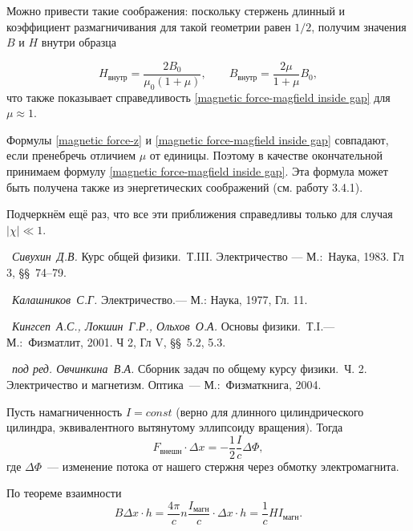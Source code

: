 Можно привести такие соображения: поскольку стержень длинный и коэффициент размагничивания для такой геометрии равен $1/2$,  получим значения $B$ и $H$ внутри образца

\begin{equation*}
	H_{\text{внутр}} = \frac{2B_0}{\mu_0 (1 + \mu)},\qquad	B_{\text{внутр}} = \frac{2\mu}{1 + \mu} B_0,
\end{equation*}
что также показывает справедливость \eqref{magnetic force-magfield inside gap} для $\mu \approx 1$.

Формулы \eqref{magnetic force-z} и \eqref{magnetic force-magfield inside gap} совпадают, если пренебречь отличием $\mu$ от единицы. Поэтому в качестве окончательной принимаем формулу \eqref{magnetic force-magfield inside gap}. Эта формула может быть получена также из энергетических соображений (см. работу 3.4.1).

Подчеркнём ещё раз, что все эти приближения справедливы только для случая $|\chi| \ll 1$.

\begin{lab:literature}
	\item~\emph{Сивухин~Д.В.} Курс общей физики.~Т.III. Электричество --- М.:~Наука, 1983. Гл 3, \S\S~74--79.
	\item~\emph{Калашников~С.Г.} Электричество.--- М.: Наука, 1977, Гл. 11.
	\item~\emph{Кингсеп~А.С., Локшин~Г.Р., Ольхов~О.А.} Основы физики.~Т.I.--- М.:~Физматлит, 2001. Ч 2, Гл V, \S\S~5.2, 5.3.
	\item~\emph{под ред. Овчинкина~В.А.} Сборник задач по общему курсу физики.~Ч. 2. Электричество и магнетизм. Оптика~--- М.:~Физматкнига, 2004.
\end{lab:literature}


Пусть намагниченность $I = const$ (верно для длинного цилиндрического цилиндра, эквивалентного вытянутому эллипсоиду вращения).
Тогда
\begin{equation*}
	F_{\text{внешн}} \cdot \Delta x = - \frac{1}{2} \frac{I}{c} \Delta \Phi,
\end{equation*}
где $\Delta \Phi$~--- изменение потока от нашего стержня через обмотку электромагнита.

По теореме взаимности
\begin{equation*}
	B\Delta x \cdot h = \frac{4\pi}{c} n \frac{I_{\text{магн}}}{c} \cdot \Delta x \cdot h = \frac{1}{c}HI_{\text{магн}}.
\end{equation*}

